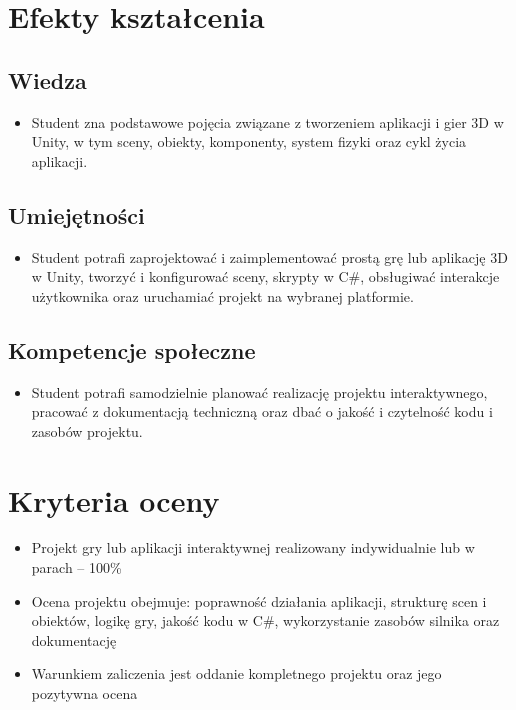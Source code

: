 \documentclass[12pt, a4paper]{article}
\begin{document}
\section{Efekty kształcenia}

\subsection*{Wiedza}
\begin{itemize}
  \item Student zna podstawowe pojęcia związane z tworzeniem aplikacji i gier 3D w Unity, w tym sceny, obiekty, komponenty, system fizyki oraz cykl życia aplikacji.
\end{itemize}

\subsection*{Umiejętności}
\begin{itemize}
  \item Student potrafi zaprojektować i zaimplementować prostą grę lub aplikację 3D w Unity, tworzyć i konfigurować sceny, skrypty w C\#, obsługiwać interakcje użytkownika oraz uruchamiać projekt na wybranej platformie.
\end{itemize}

\subsection*{Kompetencje społeczne}
\begin{itemize}
  \item Student potrafi samodzielnie planować realizację projektu interaktywnego, pracować z dokumentacją techniczną oraz dbać o jakość i czytelność kodu i zasobów projektu.
\end{itemize}

\section{Kryteria oceny}

\begin{itemize}
  \item Projekt gry lub aplikacji interaktywnej realizowany indywidualnie lub w parach – 100\%
  \item Ocena projektu obejmuje: poprawność działania aplikacji, strukturę scen i obiektów, logikę gry, jakość kodu w C\#, wykorzystanie zasobów silnika oraz dokumentację
  \item Warunkiem zaliczenia jest oddanie kompletnego projektu oraz jego pozytywna ocena
\end{itemize}
\end{document}
